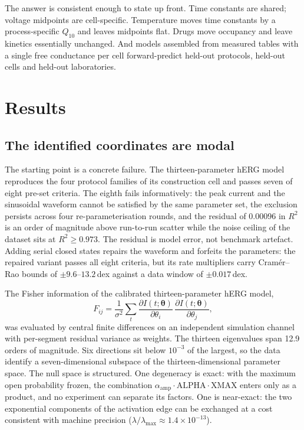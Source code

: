 \documentclass[11pt,a4paper]{article}
\begin{document}
The answer is consistent enough to state up front. Time constants are shared;
voltage midpoints are cell-specific. Temperature moves time constants by a
process-specific $Q_{10}$ and leaves midpoints flat. Drugs move occupancy and
leave kinetics essentially unchanged. And models assembled from measured tables
with a single free conductance per cell forward-predict held-out protocols,
held-out cells and held-out laboratories.

\section{Results}

\subsection{The identified coordinates are modal}

The starting point is a concrete failure. The thirteen-parameter hERG model
reproduces the four protocol families of its construction cell and passes seven
of eight pre-set criteria. The eighth fails informatively: the peak current and
the sinusoidal waveform cannot be satisfied by the same parameter set, the
exclusion persists across four re-parameterisation rounds, and the residual of
0.00096 in $R^{2}$ is an order of magnitude above run-to-run scatter while the
noise ceiling of the dataset sits at $R^{2}\ge0.973$. The residual is model
error, not benchmark artefact. Adding serial closed states repairs the waveform
and forfeits the parameters: the repaired variant passes all eight criteria,
but its rate multipliers carry Cram\'er--Rao bounds of $\pm9.6$--$13.2$\,dex
against a data window of $\pm0.017$\,dex.

The Fisher information of the calibrated thirteen-parameter hERG model,
\begin{equation}
F_{ij} = \frac{1}{\sigma^{2}}\sum_{t}
\frac{\partial I(t;\boldsymbol{\theta})}{\partial\theta_i}\,
\frac{\partial I(t;\boldsymbol{\theta})}{\partial\theta_j},
\label{eq:fisher}
\end{equation}
was evaluated by central finite differences on an independent simulation channel
with per-segment residual variance as weights. The thirteen eigenvalues span
12.9 orders of magnitude. Six directions sit below $10^{-3}$ of the largest, so
the data identify a seven-dimensional subspace of the thirteen-dimensional
parameter space. The null space is structured. One degeneracy is exact: with the
maximum open probability frozen, the combination
$\alpha_{\mathrm{amp}}\cdot\mathrm{ALPHA}\cdot\mathrm{XMAX}$ enters only as a
product, and no experiment can separate its factors. One is near-exact: the two
exponential components of the activation edge can be exchanged at a cost
consistent with machine precision
($\lambda/\lambda_{\max}\approx1.4\times10^{-13}$).
\end{document}
